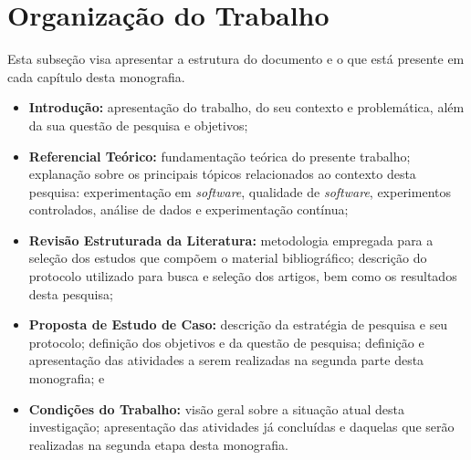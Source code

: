 \section{Organização do Trabalho}
\label{sec:organizacao}

Esta subseção visa apresentar a estrutura do documento e o que está presente em cada capítulo desta monografia.

\begin{itemize}
    \item \textbf{Introdução:} apresentação do trabalho, do seu contexto e problemática, além da sua questão de pesquisa e objetivos;
    \item \textbf{Referencial Teórico:} fundamentação teórica do presente trabalho; explanação sobre os principais tópicos relacionados ao contexto desta pesquisa: experimentação em \textit{software}, qualidade de \textit{software}, experimentos controlados, análise de dados e experimentação contínua;
    \item \textbf{Revisão Estruturada da Literatura:} metodologia empregada para a seleção dos estudos que compõem o material bibliográfico; descrição do protocolo utilizado para busca e seleção dos artigos, bem como os resultados desta pesquisa;
    \item \textbf{Proposta de Estudo de Caso:} descrição da estratégia de pesquisa e seu protocolo; definição dos objetivos e da questão de pesquisa; definição e apresentação das atividades a serem realizadas na segunda parte desta monografia; e
    \item \textbf{Condições do Trabalho:} visão geral sobre a situação atual desta investigação; apresentação das atividades já concluídas e daquelas que serão realizadas na segunda etapa desta monografia.
\end{itemize}

\pagebreak